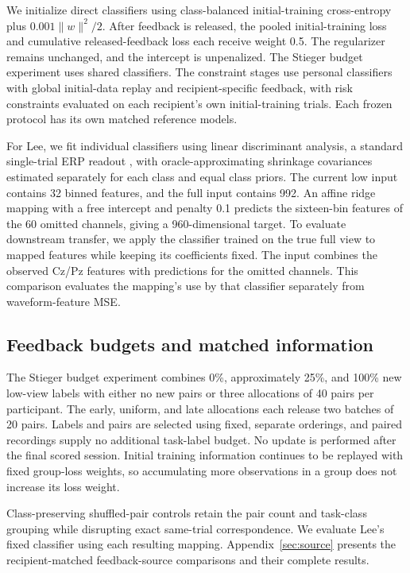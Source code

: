 \documentclass[11pt,a4paper]{article}
\begin{document}
We initialize direct classifiers using class-balanced initial-training cross-entropy plus $0.001\|w\|^2/2$. After feedback is released, the pooled initial-training loss and cumulative released-feedback loss each receive weight 0.5. The regularizer remains unchanged, and the intercept is unpenalized. The Stieger budget experiment uses shared classifiers. The constraint stages use personal classifiers with global initial-data replay and recipient-specific feedback, with risk constraints evaluated on each recipient's own initial-training trials. Each frozen protocol has its own matched reference models.

For Lee, we fit individual classifiers using linear discriminant analysis, a standard single-trial ERP readout \cite{blankertz2011}, with oracle-approximating shrinkage covariances \cite{chen2010} estimated separately for each class and equal class priors. The current low input contains 32 binned features, and the full input contains 992. An affine ridge mapping with a free intercept and penalty 0.1 predicts the sixteen-bin features of the 60 omitted channels, giving a 960-dimensional target. To evaluate downstream transfer, we apply the classifier trained on the true full view to mapped features while keeping its coefficients fixed. The input combines the observed Cz/Pz features with predictions for the omitted channels. This comparison evaluates the mapping's use by that classifier separately from waveform-feature MSE.

\subsection{Feedback budgets and matched information}

The Stieger budget experiment combines 0\%, approximately 25\%, and 100\% new low-view labels with either no new pairs or three allocations of 40 pairs per participant. The early, uniform, and late allocations each release two batches of 20 pairs. Labels and pairs are selected using fixed, separate orderings, and paired recordings supply no additional task-label budget. No update is performed after the final scored session. Initial training information continues to be replayed with fixed group-loss weights, so accumulating more observations in a group does not increase its loss weight.

Class-preserving shuffled-pair controls retain the pair count and task-class grouping while disrupting exact same-trial correspondence. We evaluate Lee's fixed classifier using each resulting mapping. Appendix~\ref{sec:source} presents the recipient-matched feedback-source comparisons and their complete results.
\end{document}
